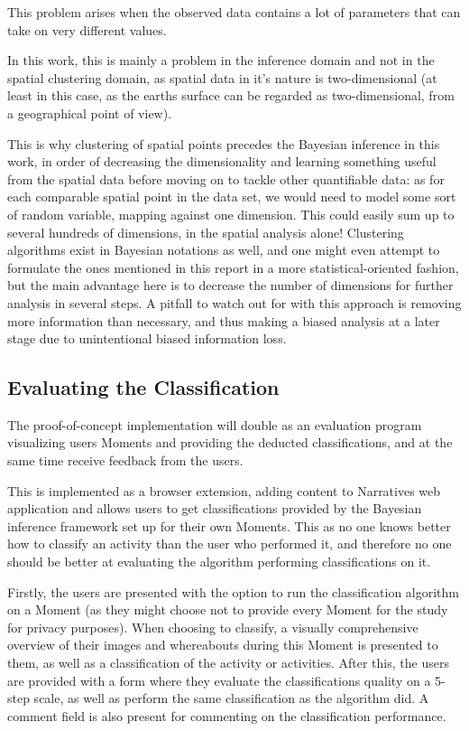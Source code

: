 This problem arises when the observed data contains a lot of parameters that 
can take on very different values.

In this work, this is mainly a problem in the inference domain and not in the 
spatial clustering domain, as spatial data in 
it's nature is two-dimensional (at least in this case, as the earths
surface can be regarded as two-dimensional, from a geographical point of 
view).

This is why clustering of spatial points precedes the Bayesian inference 
in this work, in order of decreasing the dimensionality and learning 
something useful from the spatial data before moving on to tackle other 
quantifiable data: as for each comparable spatial point in the data set, we 
would need to model some sort of random variable, mapping against one 
dimension. This could easily sum up to several hundreds of dimensions, in 
the spatial analysis alone! Clustering algorithms exist in Bayesian 
notations as well, and one might even attempt to formulate the ones 
mentioned in this report in a more statistical-oriented fashion, but the 
main advantage here is to decrease the number of dimensions for further 
analysis in several steps. A pitfall to watch out for with this approach 
is removing more information than necessary, and thus making a biased 
analysis at a later stage due to unintentional biased information loss.

\subsection{Evaluating the Classification}
The proof-of-concept implementation will double as an evaluation program
visualizing users Moments and providing the deducted classifications, and
at the same time receive feedback from the users.

This is implemented as a browser extension, adding content to Narratives
web application and allows users to get classifications provided by the 
Bayesian inference framework set up for their own Moments. This as no one 
knows better how to classify an activity than the user who performed it, 
and therefore no one should be better at evaluating the algorithm 
performing classifications on it. 

Firstly, the users are presented with the option to run the classification
algorithm on a Moment (as they might choose not to provide every Moment
for the study for privacy purposes). When choosing to classify, a
visually comprehensive overview of their images and whereabouts during
this Moment is presented to them, as well as a classification of the 
activity or activities. After this, the users are provided with a form
where they evaluate the classifications quality on a 5-step scale, as
well as perform the same classification as the algorithm did. A comment
field is also present for commenting on the classification performance. 


